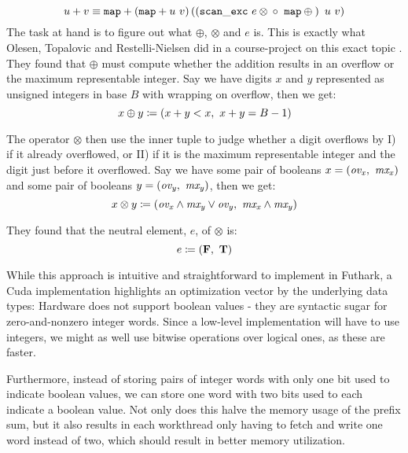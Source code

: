 \begin{equation}
\label{eq:addgpu}
u + v \equiv \mathtt{map} + \left( \mathtt{map} + u~v\right) \left(\left({\mathtt{scan\_exc}~e \otimes \phantom{}} \circ~\mathtt{map} \oplus \phantom{}\right)~u~v\right)
\end{equation}
The task at hand is to figure out what $\oplus$, $\otimes$ and $e$ is. This is exactly what
Olesen, Topalovic and Restelli-Nielsen did in a course-project on this exact
topic \cite{DPP-PROJECT}. They found that $\oplus$ must compute whether the addition
results in an overflow or the maximum representable integer. Say we have digits
$x$ and $y$ represented as unsigned integers in base $B$ with wrapping on
overflow, then we get:
\begin{equation}
\label{eq:oplus}
x \oplus y \coloneq (x + y < x,~x + y = B-1)
\end{equation}

The operator $\otimes$ then use the inner tuple to judge whether a digit overflows by
I) if it already overflowed, or II) if it is the maximum representable integer
and the digit just before it overflowed. Say we have some pair of booleans
$x = (\mathit{ov_x},~\mathit{mx_{x}})$ and some pair of booleans
$y = (\mathit{ov_y},~\mathit{mx_{y}})$, then we get:
\begin{equation}
  \label{eq:otimes}
  x \otimes y \coloneq (\mathit{ov_x} \land \mathit{mx_y} \lor \mathit{ov_y},~\mathit{mx_x} \land \mathit{mx_y})
\end{equation}

They found that the neutral element, $e$, of $\otimes$ is:
\begin{equation}
  \label{eq:otimesne}
  e \coloneq (\mathbf{F},~\mathbf{T})
\end{equation}

While this approach is intuitive and straightforward to implement in Futhark, a
Cuda implementation highlights an optimization vector by the underlying data
types: Hardware does not support boolean values - they are syntactic sugar for
zero-and-nonzero integer words. Since a low-level implementation will have to
use integers, we might as well use bitwise operations over logical ones, as
these are faster.

Furthermore, instead of storing pairs of integer words with only one bit used to
indicate boolean values, we can store one word with two bits used to each
indicate a boolean value. Not only does this halve the memory usage of the
prefix sum, but it also results in each workthread only having to fetch and
write one word instead of two, which should result in better memory utilization.

